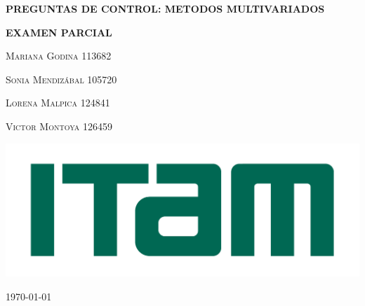 \begin{titlepage}
    \begin{center}
   

     
     		\centering \fontsize{20pt}{40pt}\selectfont %
     		\vspace*{2cm} 
     		
     		{ \bfseries PREGUNTAS DE CONTROL: METODOS MULTIVARIADOS} \\
     		
     		\vspace*{2cm} 
     	
        
     \vspace*{1cm}
     
     
     {\huge \bfseries EXAMEN PARCIAL\\}        
        
     
     \vspace*{2cm}
     
     
     {\centering \large 
      {\textsc{Mariana Godina 113682}} \\ 
     }
     
     \vspace*{.2cm}
     
     {\centering \large 
      {\textsc{Sonia Mendizábal 105720}} \\ 
     }
    
     \vspace*{.2cm}
     
     {\centering \large 
      {\textsc{Lorena Malpica 124841}} \\ 
     }
     
     \vspace*{.2cm}
     {\centering \large 
      {\textsc{Victor Montoya 126459}} \\ 
     }
     
     \vspace*{4.5cm}
     
        
     
     
     {\centering \large
     \medskip
     \includegraphics[width = .2\textwidth]{logo-ITAM.png} \\
     }
    
     
       
     
     \vfill

     
     \vspace{.3cm}
     
     {\centering \large 
     \today \\
     }

    
        
    \end{center}
\end{titlepage}


